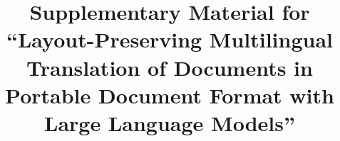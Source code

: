 \documentclass[preprint,12pt,authoryear]{elsarticle}
\begin{document}
\begin{frontmatter}
\title{Supplementary Material for ``Layout-Preserving Multilingual Translation
of Documents in Portable Document Format with Large Language Models''}
\end{frontmatter}

\appendix






\end{document}
